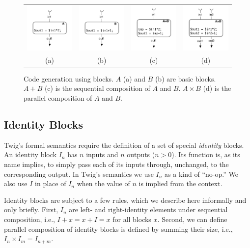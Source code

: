\begin{figure}[ht]
\centering
\begin{tabular}{cccc}
\includegraphics[width=1.1in]{images/codegen-a}& 
\includegraphics[width=1.1in]{images/codegen-b}& 
\includegraphics[width=1.1in]{images/codegen-seq}& 
\includegraphics[width=1.1in]{images/codegen-par}\\
(a)&(b)&(c)&(d)\\
\end{tabular}
\caption{Code generation using blocks. $A$ (a) and $B$ (b) are basic blocks. $A+B$ (c) is the sequential composition of $A$ and $B$. $A \times B$ (d) is the parallel composition of $A$ and $B$.}
\label{fig:codegen}
\end{figure}


\subsection{Identity Blocks}

Twig's formal semantics require the definition of a set of special \emph{identity} blocks. An identity block $I_n$ has $n$ inputs and $n$ outputs ($n > 0$). Its function is, as its name implies, to simply pass each of its inputs through, unchanged, to the corresponding output. In Twig's semantics we use $I_n$ as a kind of ``no-op.'' We also use $I$ in place of $I_n$ when the value of $n$ is implied from the context.

Identity blocks are subject to a few rules, which we describe here informally and only briefly. First, $I_n$ are left- and right-identity elements under sequential composition, i.e., $I + x = x + I = x$ for all blocks $x$. Second, we can define parallel composition of identity blocks is defined by summing their size, i.e., $I_n \times I_m = I_{n + m}$.
